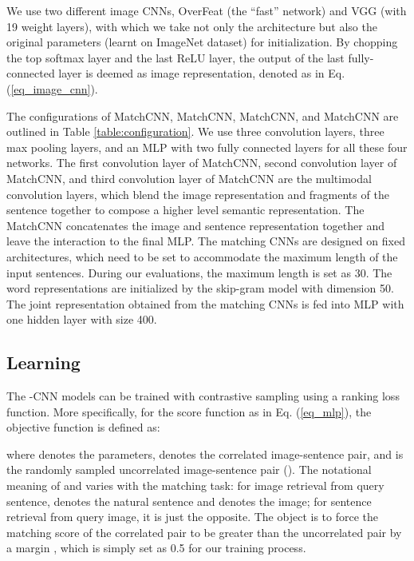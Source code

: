 \documentclass[10pt,twocolumn,letterpaper]{article}
\begin{document}
We use two different image CNNs,  OverFeat \cite{sermanet_arxiv2014} (the ``fast'' network) and VGG \cite{simonyan_arxiv2014} (with 19 weight layers), with which we take not only the architecture but also the original parameters (learnt on ImageNet dataset) for initialization. By chopping the top softmax layer and the last ReLU layer, the output of the last fully-connected layer is deemed as image representation, denoted as   in Eq. (\ref{eq_image_cnn}).

The configurations of MatchCNN, MatchCNN, MatchCNN, and MatchCNN are outlined in Table \ref{table:configuration}. We use three convolution layers, three max pooling layers, and an MLP with two fully connected layers for all these four networks. The first convolution layer of MatchCNN, second convolution layer of MatchCNN, and third convolution layer of MatchCNN are the multimodal convolution layers, which blend the image representation and fragments of the sentence together to compose a higher level semantic representation. The MatchCNN concatenates the image and sentence representation together and leave the interaction to the final MLP. The matching CNNs are designed on fixed architectures, which need to be set to accommodate the maximum length of the input sentences. During our evaluations, the maximum length is set as 30. The word representations are initialized by the skip-gram model \cite{mikolov_iclr2013} with dimension 50. The joint representation obtained from the matching CNNs is fed into MLP with one hidden layer with size 400.








\subsection{Learning}
\label{sec_learning}
The -CNN models can be trained with contrastive sampling using a ranking loss function. More specifically, for the score function  as in Eq. (\ref{eq_mlp}), the objective function is defined as:



where  denotes the parameters,  denotes the correlated image-sentence pair, and  is the randomly sampled uncorrelated image-sentence pair (). The notational meaning of  and  varies with the matching task: for image retrieval from query sentence,  denotes the natural sentence and  denotes the image; for sentence retrieval from query image, it is just the opposite. The object is to force the matching score of the correlated pair  to be greater than the uncorrelated pair  by a margin , which is simply set as 0.5 for our training process.
\end{document}

